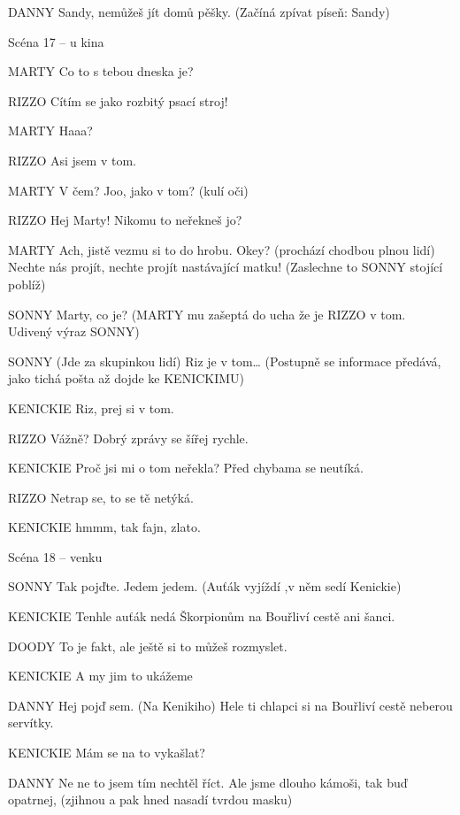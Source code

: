 DANNY        Sandy, nemůžeš jít domů pěšky. (Začíná zpívat píseň: Sandy)





 Scéna 17  – u kina 

MARTY        Co to s tebou dneska je?

RIZZO        Cítím se jako rozbitý psací stroj! 

MARTY        Haaa?

RIZZO        Asi jsem v tom.

MARTY        V čem? Joo, jako  v tom? (kulí oči)

RIZZO        Hej Marty! Nikomu to neřekneš jo?

MARTY        Ach, jistě vezmu si to do hrobu. Okey? (prochází chodbou plnou lidí)         Nechte nás projít, nechte projít nastávající matku! (Zaslechne to         SONNY stojící poblíž)

SONNY        Marty, co je? (MARTY mu zašeptá do ucha že je RIZZO v tom. Udivený         výraz SONNY) 

SONNY        (Jde za skupinkou lidí) Riz je v tom… (Postupně se informace předává,         jako tichá pošta až dojde ke KENICKIMU)

KENICKIE        Riz, prej si v tom.

RIZZO        Vážně? Dobrý zprávy se šířej rychle.

KENICKIE        Proč jsi mi o tom neřekla? Před chybama se neutíká.

RIZZO        Netrap se, to se tě netýká. 

KENICKIE        hmmm, tak fajn, zlato. 





Scéna 18  – venku

SONNY        Tak pojďte. Jedem jedem. (Auťák vyjíždí ,v něm sedí Kenickie)

KENICKIE        Tenhle auťák nedá Škorpionům na Bouřliví cestě ani šanci.

DOODY        To je fakt, ale ještě si to můžeš rozmyslet.  

KENICKIE        A my jim to ukážeme

DANNY        Hej pojď sem. (Na Kenikiho) Hele ti chlapci si na Bouřliví cestě neberou         servítky.

KENICKIE        Mám se na to vykašlat?

DANNY        Ne ne to jsem tím nechtěl říct. Ale jsme dlouho kámoši, tak buď opatrnej, (zjihnou a pak hned nasadí tvrdou masku)

